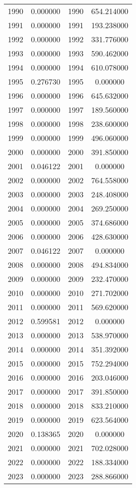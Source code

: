 \documentclass[12pt]{article}
\begin{document}
\begin{longtable}{@{}cccc@{}}
1990 & 0.000000 & 1990 & 654.214000 \\
1991 & 0.000000 & 1991 & 193.238000 \\
1992 & 0.000000 & 1992 & 331.776000 \\
1993 & 0.000000 & 1993 & 590.462000 \\
1994 & 0.000000 & 1994 & 610.078000 \\
1995 & 0.276730 & 1995 & 0.000000 \\
1996 & 0.000000 & 1996 & 645.632000 \\
1997 & 0.000000 & 1997 & 189.560000 \\
1998 & 0.000000 & 1998 & 238.600000 \\
1999 & 0.000000 & 1999 & 496.060000 \\
2000 & 0.000000 & 2000 & 391.850000 \\
2001 & 0.046122 & 2001 & 0.000000 \\
2002 & 0.000000 & 2002 & 764.558000 \\
2003 & 0.000000 & 2003 & 248.408000 \\
2004 & 0.000000 & 2004 & 269.250000 \\
2005 & 0.000000 & 2005 & 374.686000 \\
2006 & 0.000000 & 2006 & 428.630000 \\
2007 & 0.046122 & 2007 & 0.000000 \\
2008 & 0.000000 & 2008 & 494.834000 \\
2009 & 0.000000 & 2009 & 232.470000 \\
2010 & 0.000000 & 2010 & 271.702000 \\
2011 & 0.000000 & 2011 & 569.620000 \\
2012 & 0.599581 & 2012 & 0.000000 \\
2013 & 0.000000 & 2013 & 538.970000 \\
2014 & 0.000000 & 2014 & 351.392000 \\
2015 & 0.000000 & 2015 & 752.294000 \\
2016 & 0.000000 & 2016 & 203.046000 \\
2017 & 0.000000 & 2017 & 391.850000 \\
2018 & 0.000000 & 2018 & 833.210000 \\
2019 & 0.000000 & 2019 & 623.564000 \\
2020 & 0.138365 & 2020 & 0.000000 \\
2021 & 0.000000 & 2021 & 702.028000 \\
2022 & 0.000000 & 2022 & 188.334000 \\
2023 & 0.000000 & 2023 & 288.866000 \\

\end{longtable}
\end{document}
